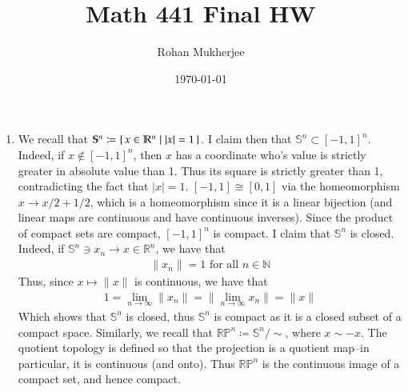 \documentclass[12pt]{article}
\title{Math 441 Final HW}
\date{\today}
\author{Rohan Mukherjee}
\theoremstyle{definitionstyle}
\def\mbb#1{\mathbb{#1}}
\def\bN{\mbb{N}}
\def \R{\mbb{R}}
\newcommand{\mg}[1]{\| #1 \|}
\renewcommand{\S}{\mbb S}
\begin{document}
	\maketitle
	\begin{enumerate}[leftmargin=\labelsep]
		\item We recall that $\S^n \coloneqq \set{x \in \R^n | |x| = 1}$. I claim then that $\S^n \subset [-1,1]^n$. Indeed, if $x \not \in [-1,1]^n$, then $x$ has a coordinate who's value is strictly greater in absolute value than 1. Thus its square is strictly greater than 1, contradicting the fact that $|x| = 1$. $[-1,1] \cong [0, 1]$ via the homeomorphism $x \to x/2 + 1/2$, which is a homeomorphism since it is a linear bijection (and linear maps are continuous and have continuous inverses). Since the product of compact sets are compact, $[-1,1]^n$ is compact. I claim that $\S^n$ is closed. Indeed, if $\S^n \ni x_n \to x \in \R^n$, we have that 
		\begin{align*}
			\mg{x_n} = 1 \text{ for all $n \in \bN$}
		\end{align*}
		Thus, since $x \mapsto \mg{x}$ is continuous, we have that
		\begin{align*}
			1 = \lim_{n \to \infty} \mg{x_n} = \mg{\lim_{n \to \infty} x_n} = \mg{x}
		\end{align*}
		Which shows that $\S^n$ is closed, thus $\S^n$ is compact as it is a closed subset of a compact space. Similarly, we recall that $\R \mbb P^n \coloneqq \S^n / \sim$, where $x \sim -x$. The quotient topology is defined so that the projection is a quotient map--in particular, it is continuous (and onto). Thus $\R \mbb P^n$ is the continuous image of a compact set, and hence compact.
		

\end{enumerate}
\end{document}
